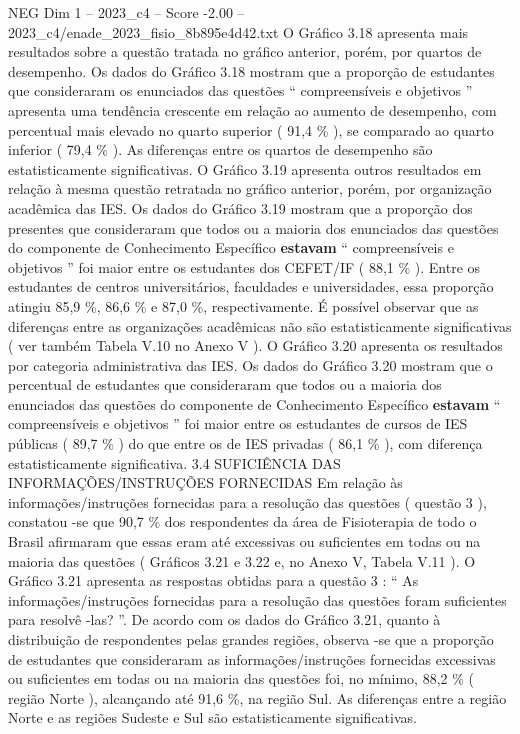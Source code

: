 \begin{textsample}{NEG Dim 1 – 2023\_c4 – Score -2.00 – 2023\_c4/enade\_2023\_fisio\_8b895e4d42.txt}
O Gráfico 3.18 apresenta mais resultados sobre a questão tratada no gráfico anterior, porém, por quartos de desempenho.
Os dados do Gráfico 3.18 mostram que a proporção de estudantes que consideraram os enunciados das questões “ compreensíveis e objetivos ” apresenta uma tendência crescente em relação ao aumento de desempenho, com percentual mais elevado no quarto superior ( 91,4 \% ), se comparado ao quarto inferior ( 79,4 \% ).
As diferenças entre os quartos de desempenho são estatisticamente significativas.
O Gráfico 3.19 apresenta outros resultados em relação à mesma questão retratada no gráfico anterior, porém, por organização acadêmica das IES.
Os dados do Gráfico 3.19 mostram que a proporção dos presentes que consideraram que todos ou a maioria dos enunciados das questões do componente de Conhecimento Específico \textbf{estavam} “ compreensíveis e objetivos ” foi maior entre os estudantes dos CEFET/IF ( 88,1 \% ).
Entre os estudantes de centros universitários, faculdades e universidades, essa proporção atingiu 85,9 \%, 86,6 \% e 87,0 \%, respectivamente.
É possível observar que as diferenças entre as organizações acadêmicas não são estatisticamente significativas ( ver também Tabela V.10 no Anexo V ).
O Gráfico 3.20 apresenta os resultados por categoria administrativa das IES.
Os dados do Gráfico 3.20 mostram que o percentual de estudantes que consideraram que todos ou a maioria dos enunciados das questões do componente de Conhecimento Específico \textbf{estavam} “ compreensíveis e objetivos ” foi maior entre os estudantes de cursos de IES públicas ( 89,7 \% ) do que entre os de IES privadas ( 86,1 \% ), com diferença estatisticamente significativa. 3.4 SUFICIÊNCIA DAS INFORMAÇÕES/INSTRUÇÕES FORNECIDAS Em relação às informações/instruções fornecidas para a resolução das questões ( questão 3 ), constatou -se que 90,7 \% dos respondentes da área de Fisioterapia de todo o Brasil afirmaram que essas eram até excessivas ou suficientes em todas ou na maioria das questões ( Gráficos 3.21 e 3.22 e, no Anexo V, Tabela V.11 ).
O Gráfico 3.21 apresenta as respostas obtidas para a questão 3 : “ As informações/instruções fornecidas para a resolução das questões foram suficientes para resolvê -las? ”.
De acordo com os dados do Gráfico 3.21, quanto à distribuição de respondentes pelas grandes regiões, observa -se que a proporção de estudantes que consideraram as informações/instruções fornecidas excessivas ou suficientes em todas ou na maioria das questões foi, no mínimo, 88,2 \% ( região Norte ), alcançando até 91,6 \%, na região Sul.
As diferenças entre a região Norte e as regiões Sudeste e Sul são estatisticamente significativas.

\end{textsample}
